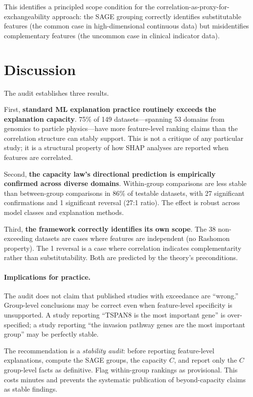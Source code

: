 \documentclass[11pt]{article}
\begin{document}
This identifies a principled scope condition for the correlation-as-proxy-for-exchangeability approach: the SAGE grouping correctly identifies
substitutable features (the common case in high-dimensional continuous
data) but misidentifies complementary features (the uncommon case in
clinical indicator data).

\section{Discussion}

The audit establishes three results.

First, \textbf{standard ML explanation practice routinely exceeds the
explanation capacity}.  75\% of 149 datasets---spanning 53 domains from
genomics to particle physics---have more feature-level ranking claims than
the correlation structure can stably support.  This is not a critique of
any particular study; it is a structural property of how SHAP analyses are
reported when features are correlated.

Second, \textbf{the capacity law's directional prediction is empirically
confirmed across diverse domains}.  Within-group comparisons are less
stable than between-group comparisons in 86\% of testable datasets, with
27 significant confirmations and 1 significant reversal (27:1 ratio).  The
effect is robust across model classes and explanation methods.

Third, \textbf{the framework correctly identifies its own scope}.  The
38 non-exceeding datasets are cases where features are independent (no
Rashomon property).  The 1 reversal is a case where correlation indicates
complementarity rather than substitutability.  Both are predicted by the
theory's preconditions.

\paragraph{Implications for practice.}
The audit does not claim that published studies with exceedance are
``wrong.''  Group-level conclusions may be correct even when feature-level
specificity is unsupported.  A study reporting ``TSPAN8 is the most
important gene'' is over-specified; a study reporting ``the invasion
pathway genes are the most important group'' may be perfectly stable.

The recommendation is a \emph{stability audit}: before reporting
feature-level explanations, compute the SAGE groups, the capacity $C$,
and report only the $C$ group-level facts as definitive.  Flag
within-group rankings as provisional.  This costs minutes and prevents
the systematic publication of beyond-capacity claims as stable findings.
\end{document}
